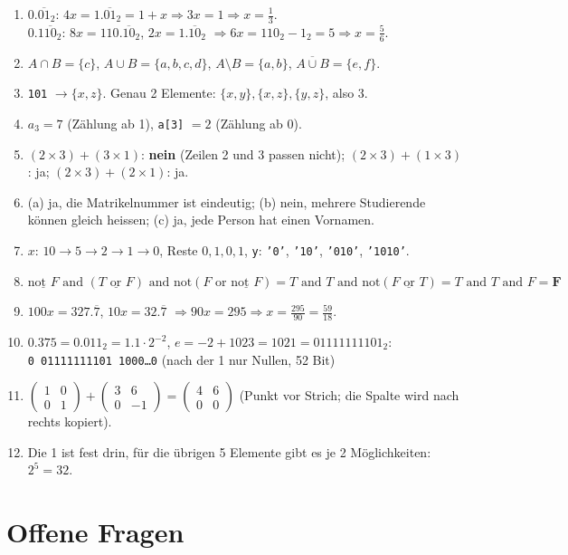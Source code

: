 \begin{enumerate}[label=\textbf{F\arabic*}]
        von Zeile 1, also beginnt die Periode sofort: $0.\overline{0011}_2$.\\
        $\tfrac1{20}$: \; $\tfrac1{20} \to \tfrac1{10}\,(\mathbf0) \to \tfrac15\,(\mathbf0)
        \to$ ab hier wie oben. Die Periode beginnt in Zeile 3: $0.00\overline{0011}_2$.
  \item $0.\overline{01}_2$: \; $4x = 1.\overline{01}_2 = 1 + x \Rightarrow 3x = 1
        \Rightarrow x = \tfrac13$.\\
        $0.1\overline{10}_2$: \; $8x = 110.\overline{10}_2$, \; $2x = 1.\overline{10}_2$
        $\Rightarrow 6x = 110_2 - 1_2 = 5 \Rightarrow x = \tfrac56$.
  \item $A \cap B = \{c\}$, \; $A \cup B = \{a,b,c,d\}$, \; $A \setminus B = \{a,b\}$, \;
        $\overline{A \cup B} = \{e,f\}$.
  \item \texttt{101} $\to \{x, z\}$. Genau 2 Elemente: $\{x,y\}, \{x,z\}, \{y,z\}$, also 3.
  \item $a_3 = 7$ (Zählung ab 1), \texttt{a[3]} $= 2$ (Zählung ab 0).
  \item $(2\times3)+(3\times1)$: \textbf{nein} (Zeilen 2 und 3 passen nicht);
        $(2\times3)+(1\times3)$: ja; \; $(2\times3)+(2\times1)$: ja.
  \item (a) ja, die Matrikelnummer ist eindeutig; (b) nein, mehrere Studierende können
        gleich heissen; (c) ja, jede Person hat einen Vornamen.
  \item $x$: $10 \to 5 \to 2 \to 1 \to 0$, Reste $0, 1, 0, 1$,
        \texttt{y}: \texttt{'0'}, \texttt{'10'}, \texttt{'010'}, \texttt{'1010'}.
  \item $\underline{\text{not } F} \text{ and } (\underline{T \text{ or } F}) \text{ and not}(F \text{ or } \underline{\text{not } F})
        = T \text{ and } T \text{ and not}(\underline{F \text{ or } T})
        = T \text{ and } T \text{ and } F = \mathbf{F}$
  \item $100x = 327.\overline{7}$, $10x = 32.\overline{7}$ $\Rightarrow 90x = 295
        \Rightarrow x = \frac{295}{90} = \frac{59}{18}$.
  \item $0.375 = 0.011_2 = 1.1 \cdot 2^{-2}$, \; $e = -2 + 1023 = 1021 = 01111111101_2$:\\
        \texttt{0 01111111101 1000\ldots0} (nach der 1 nur Nullen, 52 Bit)
  \item $\begin{pmatrix}1&0\\0&1\end{pmatrix} + \begin{pmatrix}3&6\\0&-1\end{pmatrix}
        = \begin{pmatrix}4&6\\0&0\end{pmatrix}$ \; (Punkt vor Strich; die Spalte wird nach rechts kopiert).
  \item Die 1 ist fest drin, für die übrigen 5 Elemente gibt es je 2 Möglichkeiten: $2^5 = 32$.
\end{enumerate}

\section{Offene Fragen}
